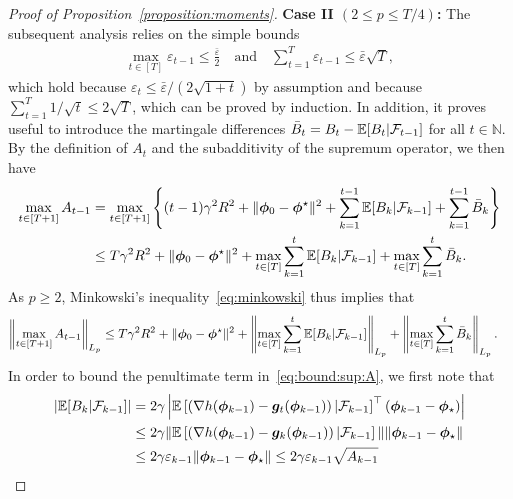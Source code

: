 \documentclass[11pt, a4paper, oneside, reqno]{article}
\begin{document}
\begin{proof}[Proof of Proposition~\ref{proposition:moments}]
		\textbf{Case II $({2 \leq p \leq T/4})$:} 
		The subsequent analysis relies on the simple bounds
		\begin{align}
		\label{eq:bound:varepsilon}
    		\textstyle 
    		\max_{t \in [T]} \varepsilon_{t-1} \leq \frac{\bar \varepsilon}{2} \quad \text{and} \quad \sum_{t=1}^T \varepsilon_{t-1} \leq \bar \varepsilon \sqrt{T},
		\end{align}
		which hold because $\varepsilon_t \leq \bar \varepsilon / (2 \sqrt{1+t})$ by assumption and because $\sum_{t=1}^T 1 / \sqrt{t} \leq 2 \sqrt{T}$, which can be proved by induction.
		In addition, it proves useful to introduce the martingale differences $ \bar B_t = B_t - \mathbb{E}[B_t | \mathcal F_{t-1}]$ for all $t\in\mathbb N$. By the definition of $A_t$ and the subadditivity of the supremum operator, we then have
		\begin{align*}
		\max_{t \in [T+1]} A_{t-1}
		&= \max_{t \in [T+1]} \left\{ (t-1) \gamma^2 R^2 + \| \bm \phi_0 - \bm \phi^\star \|^2 + \sum_{k=1}^{t-1} \mathbb{E}[B_k | \mathcal F_{k-1}] + \sum_{k=1}^{t-1} \bar B_k \right\} \\
		&\leq T \gamma^2 R^2 + \| \bm \phi_0 - \bm \phi^\star \|^2 + \max_{t \in [T]} \sum_{k=1}^t \mathbb{E}[B_k | \mathcal F_{k-1}] + \max_{t \in [T]} \sum_{k=1}^t \bar B_k .
		\end{align*}
		As $p \geq 2$,  Minkowski's inequality~\eqref{eq:minkowski} thus implies that
		\begin{align}
		\label{eq:bound:sup:A}
		\left\| \max_{t \in [T+1]} A_{t-1} \right\|_{L_p}
		&\leq T \gamma^2 R^2 + \| \bm \phi_0 - \bm \phi^\star \|^2 + \left\| \max_{t \in [T]} \sum_{k=1}^t \mathbb{E}[B_k | \mathcal F_{k-1}] \right\|_{L_p} + \left\| \max_{t \in [T]} \sum_{k=1}^t \bar B_k \right\|_{L_p}.
		\end{align}
		In order to bound the penultimate term in~\eqref{eq:bound:sup:A}, we first note that
		\begin{align}
		\left| \mathbb{E}[B_k | \mathcal F_{k-1}] \right|
		&= 2 \gamma \left| \mathbb{E} \left[ \left( \nabla h(\bm \phi_{k-1}) - \bm g_t(\bm \phi_{k-1}) \right) | \mathcal F_{k-1} \right]^\top (\bm \phi_{k-1} - \bm \phi_{\star}) \right| \notag \\
		&\leq 2 \gamma \| \mathbb{E} \left[ \left( \nabla h(\bm \phi_{k-1}) - \bm g_k(\bm \phi_{k-1}) \right) | \mathcal F_{k-1} \right] \| \| \bm \phi_{k-1} - \bm \phi_{\star} \| \notag \\
		&\leq 2 \gamma \varepsilon_{k-1} \| \bm \phi_{k-1} - \bm \phi_{\star} \|
		\leq 2 \gamma \varepsilon_{k-1}\sqrt{ A_{k-1}} \label{eq:bound:B}
		\end{align}

\end{proof}
\end{document}
